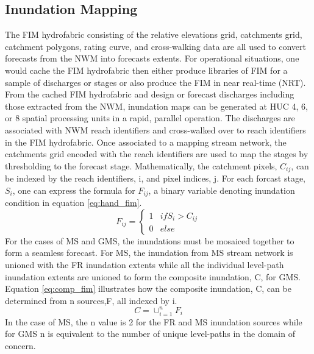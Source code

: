 \subsection{Inundation Mapping}
\label{ssec:inundation_mapping}
%
The FIM hydrofabric consisting of the relative elevations grid, catchments grid, catchment polygons, rating curve, and cross-walking data are all used to convert forecasts from the NWM into forecasts extents.
For operational situations, one would cache the FIM hydrofabric then either produce libraries of FIM for a sample of discharges or stages or also produce the FIM in near real-time (NRT).
From the cached FIM hydrofabric and design or forecast discharges including those extracted from the NWM, inundation maps can be generated at HUC 4, 6, or 8 spatial processing units in a rapid, parallel operation. 
The discharges are associated with NWM reach identifiers and cross-walked over to reach identifiers in the FIM hydrofabric.
Once associated to a mapping stream network, the catchments grid encoded with the reach identifiers are used to map the stages by thresholding to the forecast stage.
Mathematically, the catchment pixels, $C_{ij}$, can be indexed by the reach identifiers, i, and pixel indices, j.
For each forcast stage, $S_i$, one can express the formula for $F_{ij}$, a binary variable denoting inundation condition in equation \ref{eq:hand_fim}.
%
\begin{equation}
\label{eq:hand_fim}
    F_{ij} = 
    \begin{cases}
        1 & if S_i > C_{ij} \\
        0 & else
    \end{cases}
\end{equation}
%
For the cases of MS and GMS, the inundations must be mosaiced together to form a seamless forecast.
For MS, the inundation from MS stream network is unioned with the FR inundation extents while all the individual level-path inundation extents are unioned to form the composite inundation, C, for GMS.
Equation \ref{eq:comp_fim} illustrates how the composite inundation, C, can be determined from n sources,F, all indexed by i.
%
\begin{equation}
\label{eq:comp_fim}
    C = \cup_{i=1}^{n}F_i
\end{equation}
In the case of MS, the n value is 2 for the FR and MS inundation sources while for GMS n is equivalent to the number of unique level-paths in the domain of concern.
%
